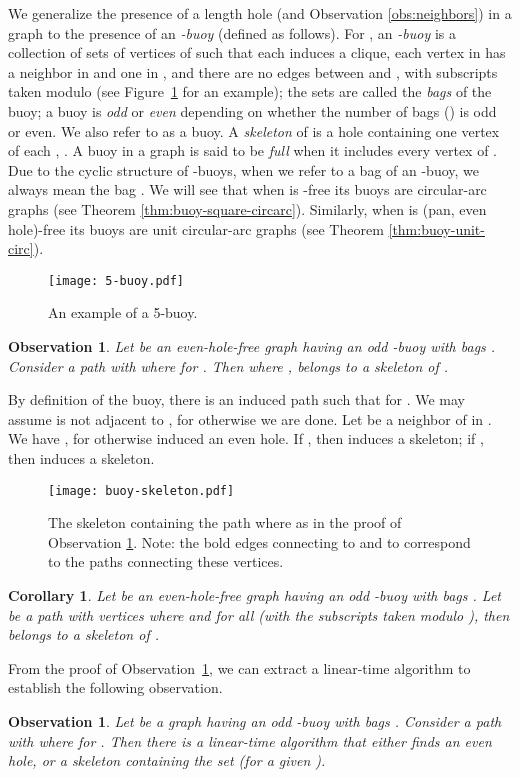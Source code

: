 \documentclass[11pt,a4paper]{article}
\newtheorem{observation}[theorem]{Observation}
\newtheorem{corollary}[theorem]{Corollary}
\newenvironment{proof}{\noindent {\it Proof:~}}{\hfill \smallskip\par}
\begin{document}
We generalize the presence of a length  hole (and
Observation \ref{obs:neighbors}) in a graph to the presence of an
\emph{-buoy} (defined as follows). For , an
{\em -buoy}  is a collection of sets  of vertices of  such that each  induces a
clique, each vertex in  has a neighbor in  and one
in , and there are no edges between  and , with subscripts taken modulo
 (see Figure~\ref{fig:5-buoy} for an example); the sets
 are called the {\em bags} of the buoy; a buoy is \emph{odd} or
\emph{even} depending on whether the number of bags () is odd or even.
We also refer to  as a buoy. A {\em skeleton} of
 is a hole containing one vertex of each , . A buoy  in a graph  is said to be
\emph{full} when it includes every vertex of . Due to the
cyclic structure of -buoys, when we refer to a bag  of
an -buoy, we always mean the bag .
We will see that when  is -free its buoys are circular-arc
graphs (see Theorem \ref{thm:buoy-square-circarc}). Similarly,
when  is (pan, even hole)-free its buoys are unit
circular-arc  graphs (see Theorem \ref{thm:buoy-unit-circ}).
\begin{figure}[h]
\centering
\texttt{[image: 5-buoy.pdf]}
\caption{An example of a 5-buoy.}
\label{fig:5-buoy}
\end{figure}
\begin{observation}\label{obs:hole}
Let  be an even-hole-free graph having an odd -buoy with bags . Consider a path  with  where  for . Then where
,  belongs to a skeleton of .
\end{observation}
\begin{proof}
By definition of the buoy, there is an induced path  such that  for . We may assume  is not adjacent to , for
otherwise we are done. Let  be a neighbor of  in
. We have , for otherwise
 induced an even
hole. If , then  induces a
skeleton; if , then  induces a skeleton.
\end{proof}
\begin{figure}[h]
\centering
\texttt{[image: buoy-skeleton.pdf]}
\caption{The skeleton containing the path 
where  as in the proof of Observation
\ref{obs:hole}. Note: the bold edges connecting  to
 and  to  correspond to the paths
connecting these vertices.}
\end{figure}


\begin{corollary}\label{cor:hole}
Let  be an even-hole-free graph having an odd -buoy with bags 
 . Let  be a path with
vertices  where  and  for all  (with the subscripts taken
modulo ), then  belongs to a skeleton of .
\hfill
\end{corollary}
From the proof of Observation~\ref{obs:hole}, we can extract a
linear-time algorithm to establish the following observation.
\begin{observation}\label{obs:find-hole}
Let  be a graph having an odd -buoy with bags . Consider a path  with  where  for . Then there is a linear-time algorithm that either
finds an even hole, or a skeleton containing the set   (for a given ). \hfill

\end{observation}
\end{document}
